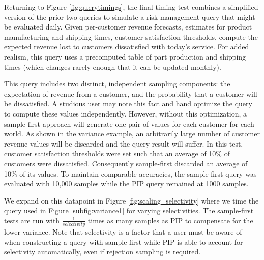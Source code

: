Returning to Figure \ref{fig:querytimings}, the final timing test combines a simplified version of the prior two queries to simulate a risk management query that might be evaluated daily.  Given per-customer revenue forecasts, estimates for product manufacturing and shipping times, customer satisfaction thresholds, compute the expected revenue lost to customers dissatisfied with today's service.  For added realism, this query uses a precomputed table of part production and shipping times (which changes rarely enough that it can be updated monthly).  %

This query includes two distinct, independent sampling components: the expectation of revenue from a customer, and the probability that a customer will be dissatisfied.  A studious user may note this fact and hand optimize the query to compute these values independently.  However, without this optimization, a sample-first approach will generate one pair of values for each customer for each world.  As shown in the variance example, an arbitrarily large number of customer revenue values will be discarded and the query result will suffer.  In this test, customer satisfaction thresholds were set such that an average of 10\% of customers were dissatisfied.  Consequently sample-first discarded an average of 10\% of its values.  To maintain comparable accuracies, the sample-first query was evaluated with 10,000 samples while the PIP query remained at 1000 samples. 

We expand on this datapoint in Figure \ref{fig:scaling_selectivity} where we time the query used in Figure \ref{subfig:variance1} for varying selectivities.  The sample-first tests are run with $\frac{1}{selectivity}$ times as many samples as PIP to compensate for the lower variance.  Note that selectivity is a factor that a user must be aware of when constructing a query with sample-first while PIP is able to account for selectivity automatically, even if rejection sampling is required.

